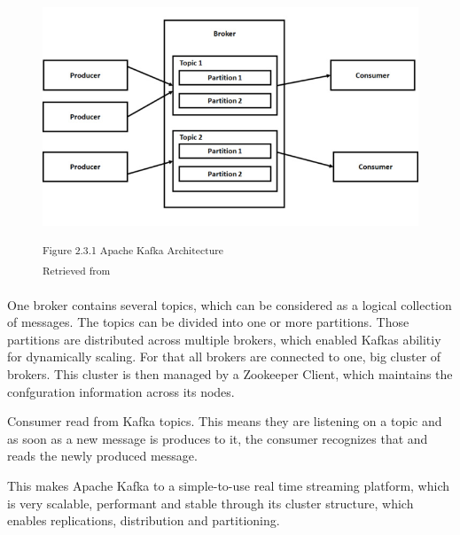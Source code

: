 \begin{figure}[h]
\centering
\includegraphics[width=\textwidth/5*4]{images/kafka_architecture.png}

\textsuperscript{Figure 2.3.1 Apache Kafka Architecture}\\
\textsuperscript{Retrieved from \cite{}}
\end{figure}

One broker contains several topics, which can be considered as a logical collection of messages. The topics can be divided into one or more partitions. Those partitions are distributed across multiple brokers, which enabled Kafkas abilitiy for dynamically scaling. For that all brokers are connected to one, big cluster of brokers. This cluster is then managed by a Zookeeper Client, which maintains the confguration information across its nodes.


Consumer read from Kafka topics. This means they are listening on a topic and as soon as a new message is produces to it, the consumer recognizes that and reads the newly produced message.

This makes Apache Kafka to a simple-to-use real time streaming platform, which is very scalable, performant and stable through its cluster structure, which enables replications, distribution and partitioning.


